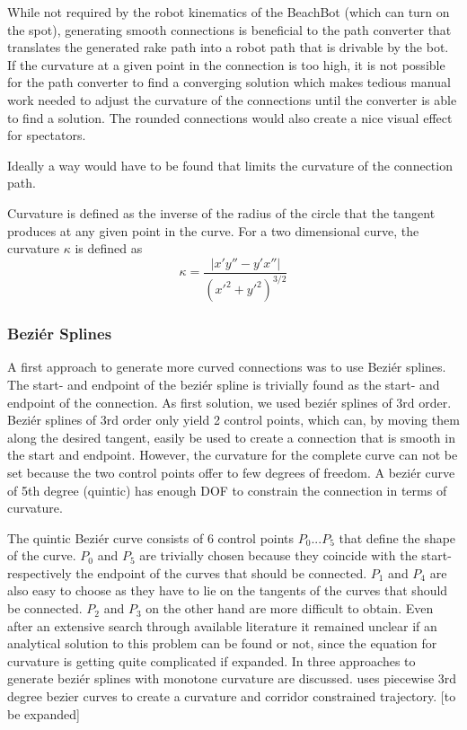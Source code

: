 \documentclass[10pt,twoside,a4paper]{report}
\begin{document}
While not required by the robot kinematics of the BeachBot (which can turn on the spot), generating smooth connections is beneficial to the path converter that translates the generated rake path into a robot path that is drivable by the bot. If the curvature at a given point in the connection is too high, it is not possible for the path converter to find a converging solution which makes tedious manual work needed to adjust the curvature of the connections until the converter is able to find a solution. The rounded connections would also create a nice visual effect for spectators.

Ideally a way would have to be found that limits the curvature of the connection path.

Curvature is defined as the inverse of the radius of the circle that the tangent produces at any given point in the curve. For a two dimensional curve, the curvature $\kappa$ is defined as 
$$\kappa = \frac{|x'y''-y'x''|}{(x'^2+y'^2)^{3/2}}$$


\subsubsection{Beziér Splines}

A first approach to generate more curved connections was to use Beziér splines.
The start- and endpoint of the beziér spline is trivially found as the start- and endpoint of the connection. As first solution, we used beziér splines of 3rd order. Beziér splines of 3rd order only yield 2 control points, which can, by moving them along the desired tangent, easily be used to create a connection that is smooth in the start and endpoint. However, the curvature for the complete curve can not be set because the two control points offer to few degrees of freedom. A beziér curve of 5th degree (quintic) has enough DOF to constrain the connection in terms of curvature.

The quintic Beziér curve consists of 6 control points $P_0 ... P_5$ that define the shape of the curve. $P_0$ and $P_5$ are trivially chosen because they coincide with the start- respectively the endpoint of the curves that should be connected. $P_1$ and $P_4$ are also easy to choose as they have to lie on the tangents of the curves that should be connected. $P_2$ and $P_3$ on the other hand are more difficult to obtain. Even after an extensive search through available literature it remained unclear if an analytical solution to this problem can be found or not, since the equation for curvature is getting quite complicated if expanded. In \cite{doi:10.1137/1.9781611971521.ch5} three approaches to generate beziér splines with monotone curvature are discussed. \cite{choi2010piecewise} uses piecewise 3rd degree bezier curves to create a curvature and corridor constrained trajectory.  [to be expanded]
\end{document}
